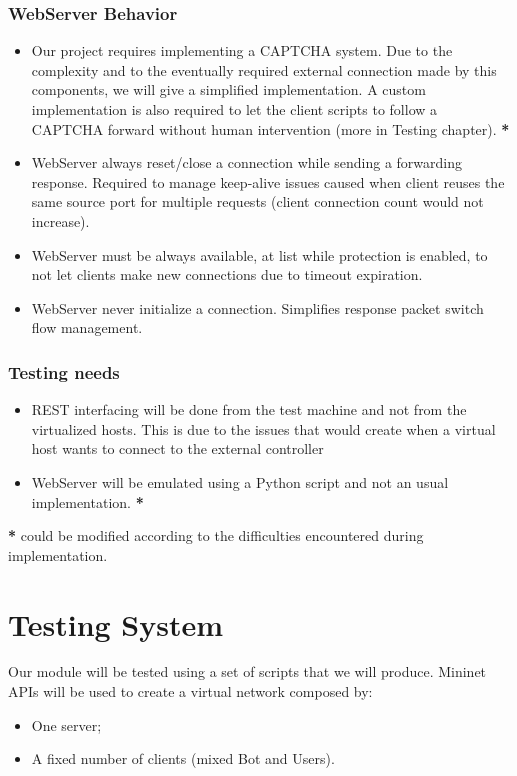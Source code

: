 \subsubsection{WebServer Behavior}
\begin{itemize}
	\item Our project requires implementing a CAPTCHA system. Due to the complexity and to the eventually required external connection made by this components, we will give a simplified implementation. A custom implementation is also required to let the client scripts to follow a CAPTCHA forward without human intervention (more in Testing chapter). \textbf{*}
	\item WebServer always reset/close a connection while sending a forwarding response. Required to manage keep-alive issues caused when client reuses the same source port for multiple requests (client connection count would not increase).
	\item WebServer must be always available, at list while protection is enabled, to not let clients make new connections due to timeout expiration.
	\item WebServer never initialize a connection. Simplifies response packet switch flow management.
\end{itemize}

\subsubsection{Testing needs}
\begin{itemize}
	\item REST interfacing will be done from the test machine and not from the virtualized hosts. This is due to the issues that would create when a virtual host wants to connect to the external controller
	\item WebServer will be emulated using a Python script and not an usual implementation. \textbf{*}
\end{itemize}

\textbf{*} could be modified according to the difficulties encountered during implementation.

\section{Testing System}
Our module will be tested using a set of scripts that we will produce. Mininet APIs will be used to create a virtual network composed by:
\begin{itemize}
	\item One server;
	\item A fixed number of clients (mixed Bot and Users).
\end{itemize}

